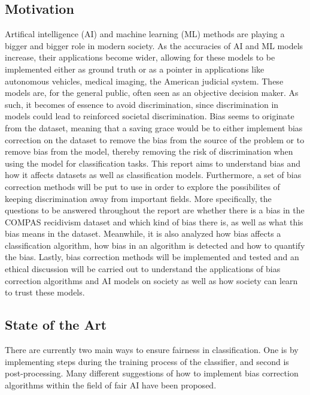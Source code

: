 \documentclass[11pt, fleqn, titlepage]{article}
\begin{document}
	\subsection{Motivation}
	Artifical intelligence (AI) and machine learning (ML) methods are playing a bigger and bigger role in modern society. As the accuracies of AI and ML models increase, their applications become wider, allowing for these  models to be implemented either as ground truth or as a pointer in applications like autonomous vehicles, medical imaging, the American judicial system. These models are, for the general public, often seen as an objective decision maker. As such, it becomes of essence to avoid discrimination, since discrimination in models could lead to reinforced societal discrimination. Bias seems to originate from the dataset, meaning that a saving grace would be to either implement bias correction on the dataset to remove the bias from the source of the problem or to remove bias from the model, thereby removing the risk of discrimination when using the model for classification tasks. This report aims to understand bias and how it affects datasets as well as classification models. Furthermore, a set of bias correction methods will be put to use in order to explore the possibilites of keeping discrimination away from important fields. More specifically, the questions to be answered throughout the report are whether there is a bias in the COMPAS recidivism dataset and which kind of bias there is, as well as what this bias means in the dataset. Meanwhile, it is also analyzed how bias affects a classification algorithm, how bias in an algorithm is detected and how to quantify the bias. Lastly, bias correction methods will be implemented and tested and an ethical discussion will be carried out to understand the applications of bias correction algorithms and AI models on society as well as how society can learn to trust these models. 
	
	\subsection{State of the Art}
	There are currently two main ways to ensure fairness in classification. One is by implementing steps during the training process of the classifier, and second is post-processing. Many different suggestions of how to implement bias correction algorithms within the field of fair AI have been proposed. 
	
\end{document}
